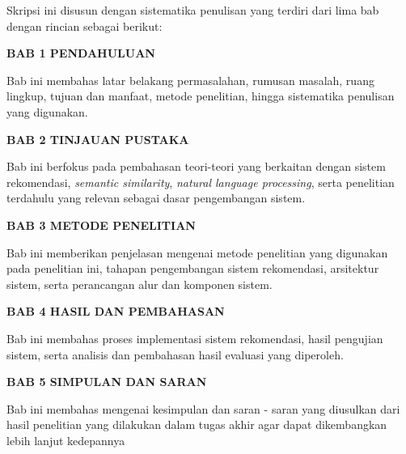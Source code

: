 Skripsi ini disusun dengan sistematika penulisan yang terdiri dari lima bab dengan rincian sebagai berikut:

\textbf{BAB 1 PENDAHULUAN}

Bab ini membahas latar belakang permasalahan, rumusan masalah, ruang lingkup, tujuan dan manfaat, metode penelitian, hingga sistematika penulisan yang digunakan.

\textbf{BAB 2 TINJAUAN PUSTAKA}

Bab ini berfokus pada pembahasan teori-teori yang berkaitan dengan sistem rekomendasi, \textit{semantic similarity}, \textit{natural language processing}, serta penelitian terdahulu yang relevan sebagai dasar pengembangan sistem.

\textbf{BAB 3 METODE PENELITIAN}

Bab ini memberikan penjelasan mengenai metode penelitian yang digunakan pada penelitian ini, tahapan pengembangan sistem rekomendasi, arsitektur sistem, serta perancangan alur dan komponen sistem.

\textbf{BAB 4 HASIL DAN PEMBAHASAN}

Bab ini membahas proses implementasi sistem rekomendasi, hasil pengujian sistem, serta analisis dan pembahasan hasil evaluasi yang diperoleh.

\textbf{BAB 5 SIMPULAN DAN SARAN}

Bab ini membahas mengenai kesimpulan dan saran - saran yang diusulkan dari hasil penelitian yang dilakukan dalam tugas akhir agar dapat dikembangkan lebih lanjut kedepannya

